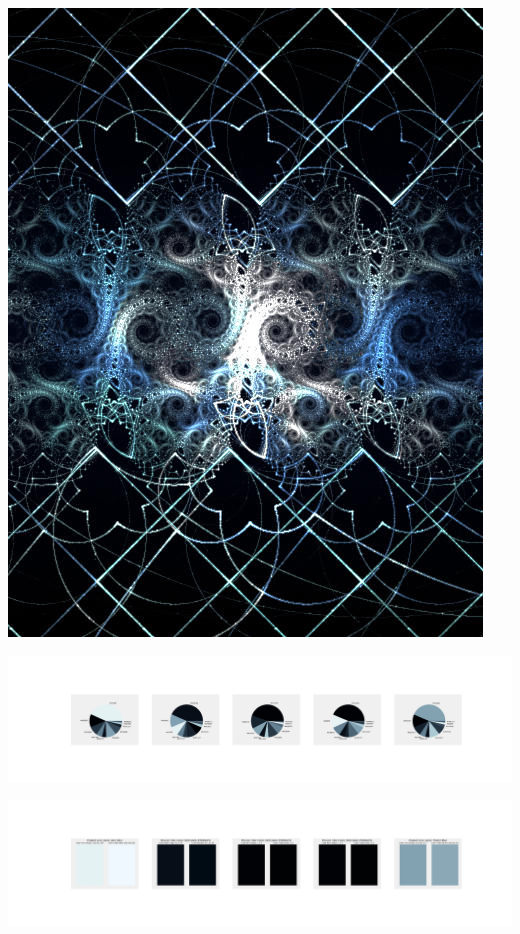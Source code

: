 \documentclass[11pt]{article}
\begin{document}
\begin{landscape}
    \begin{center}
    \includegraphics[width=\textwidth]{./nbimg/file (24).jpg}
    \end{center}

    \begin{center}
    \includegraphics[width=250mm]{./nbimg/pie-156.jpg}
    \end{center}

    \begin{center}
    \includegraphics[width=250mm]{./nbimg/peak-156.jpg}
    \end{center}
    


\end{landscape}
\end{document}
